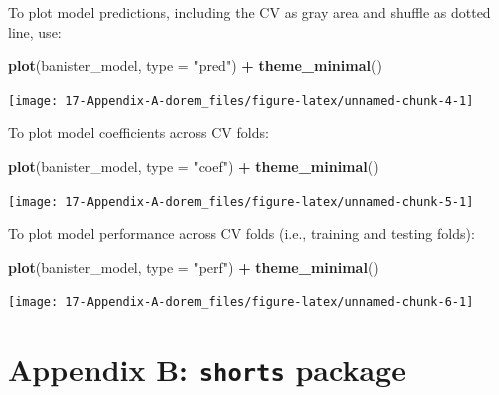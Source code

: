 \documentclass[
]{book}
\newenvironment{Shaded}{\begin{snugshade}}{\end{snugshade}}
\newcommand{\DataTypeTok}[1]{\textcolor[rgb]{0.13,0.29,0.53}{#1}}
\newcommand{\KeywordTok}[1]{\textcolor[rgb]{0.13,0.29,0.53}{\textbf{#1}}}
\newcommand{\NormalTok}[1]{#1}
\newcommand{\OperatorTok}[1]{\textcolor[rgb]{0.81,0.36,0.00}{\textbf{#1}}}
\newcommand{\StringTok}[1]{\textcolor[rgb]{0.31,0.60,0.02}{#1}}
\begin{document}
To plot model predictions, including the CV as gray area and shuffle as dotted line, use:

\begin{Shaded}
\begin{Highlighting}[]
\KeywordTok{plot}\NormalTok{(banister\_model, }\DataTypeTok{type =} \StringTok{"pred"}\NormalTok{) }\OperatorTok{+}\StringTok{ }\KeywordTok{theme\_minimal}\NormalTok{()}
\end{Highlighting}
\end{Shaded}

\begin{center}\texttt{[image: 17-Appendix-A-dorem\_files/figure-latex/unnamed-chunk-4-1]} \end{center}

To plot model coefficients across CV folds:

\begin{Shaded}
\begin{Highlighting}[]
\KeywordTok{plot}\NormalTok{(banister\_model, }\DataTypeTok{type =} \StringTok{"coef"}\NormalTok{) }\OperatorTok{+}\StringTok{ }\KeywordTok{theme\_minimal}\NormalTok{()}
\end{Highlighting}
\end{Shaded}

\begin{center}\texttt{[image: 17-Appendix-A-dorem\_files/figure-latex/unnamed-chunk-5-1]} \end{center}

To plot model performance across CV folds (i.e., training and testing folds):

\begin{Shaded}
\begin{Highlighting}[]
\KeywordTok{plot}\NormalTok{(banister\_model, }\DataTypeTok{type =} \StringTok{"perf"}\NormalTok{) }\OperatorTok{+}\StringTok{ }\KeywordTok{theme\_minimal}\NormalTok{()}
\end{Highlighting}
\end{Shaded}

\begin{center}\texttt{[image: 17-Appendix-A-dorem\_files/figure-latex/unnamed-chunk-6-1]} \end{center}

\hypertarget{appendix-b-shorts-package}{%
\chapter{\texorpdfstring{Appendix B: \texttt{shorts} package}{Appendix B: shorts package}}\label{appendix-b-shorts-package}}
\end{document}
